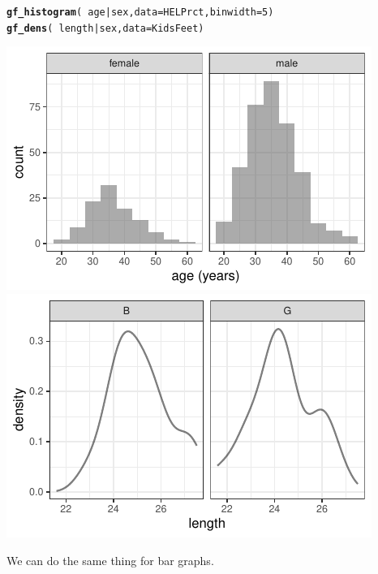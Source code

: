\documentclass[twoside]{book}\usepackage[]{graphicx}\usepackage[]{xcolor}
\makeatletter
\def\maxwidth{ %
  \ifdim\Gin@nat@width>\linewidth
    \linewidth
  \else
    \Gin@nat@width
  \fi
}
\newcommand{\hlnum}[1]{\textcolor[rgb]{0.686,0.059,0.569}{#1}}%
\newcommand{\hlopt}[1]{\textcolor[rgb]{0,0,0}{#1}}%
\newcommand{\hlstd}[1]{\textcolor[rgb]{0.345,0.345,0.345}{#1}}%
\newcommand{\hlkwc}[1]{\textcolor[rgb]{0.333,0.667,0.333}{#1}}%
\newcommand{\hlkwd}[1]{\textcolor[rgb]{0.737,0.353,0.396}{\textbf{#1}}}%
\newenvironment{kframe}{%
 \def\at@end@of@kframe{}%
 \ifinner\ifhmode%
  \def\at@end@of@kframe{\end{minipage}}%
  \begin{minipage}{\columnwidth}%
 \fi\fi%
 \def\FrameCommand##1{\hskip\@totalleftmargin \hskip-\fboxsep
 \colorbox{shadecolor}{##1}\hskip-\fboxsep
     \hskip-\linewidth \hskip-\@totalleftmargin \hskip\columnwidth}%
 \MakeFramed {\advance\hsize-\width
   \@totalleftmargin\z@ \linewidth\hsize
   \@setminipage}}%
 {\par\unskip\endMakeFramed%
 \at@end@of@kframe}
\newenvironment{knitrout}{}{} %
\makeatother
\begin{document}
\begin{knitrout}
\color{fgcolor}\begin{kframe}
\begin{alltt}
\hlkwd{gf_histogram}\hlstd{(} \hlopt{~} \hlstd{age} \hlopt{|} \hlstd{sex,} \hlkwc{data} \hlstd{= HELPrct,} \hlkwc{binwidth} \hlstd{=} \hlnum{5}\hlstd{)}
\hlkwd{gf_dens}\hlstd{(} \hlopt{~} \hlstd{length} \hlopt{|} \hlstd{sex,} \hlkwc{data} \hlstd{= KidsFeet )}
\end{alltt}
\end{kframe}

{\centering \includegraphics[width=\maxwidth]{figures/fig-compare-ages-1} 
\includegraphics[width=\maxwidth]{figures/fig-compare-ages-2} 

}



\end{knitrout}


We can do the same thing for bar graphs.
\end{document}
